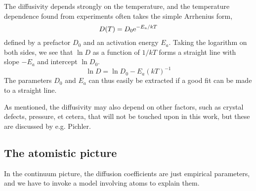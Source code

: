 \documentclass[11pt,bibliography=totoc,index=totoc]{scrbook}   %
\begin{document}
The diffusivity depends strongly on the temperature, and the temperature dependence found from experiments often takes the simple Arrhenius form,
\begin{equation}
  D(T) = D_0 \mathrm{e}^{-E_a/kT}
  \label{eq:arrhenius-dif}
\end{equation}
defined by a prefactor $D_0$ and an activation energy $E_a$. 
Taking the logarithm on both sides, we see that $\ln D$ as a function of $1/kT$ forms a straight line with slope $-E_a$ and intercept $\ln D_0$. 
\begin{equation}
  \ln D = \ln D_0 - E_a (kT)^{-1}
\end{equation}
The parameters $D_0$ and $E_a$ can thus easily be extracted if a good fit can be made to a straight line.



As mentioned, the diffusivity may also depend on other factors, such as crystal defects, pressure, et cetera, that will not be touched upon in this work, but these are discussed by e.g. Pichler.\cite{Pichler:2004}

%
\subsection{The atomistic picture}\label{sec:AtomisticPicture}
%

In the continuum picture, the diffusion coefficients are just empirical parameters, and we have to invoke a model involving atoms to explain them.
\end{document}
